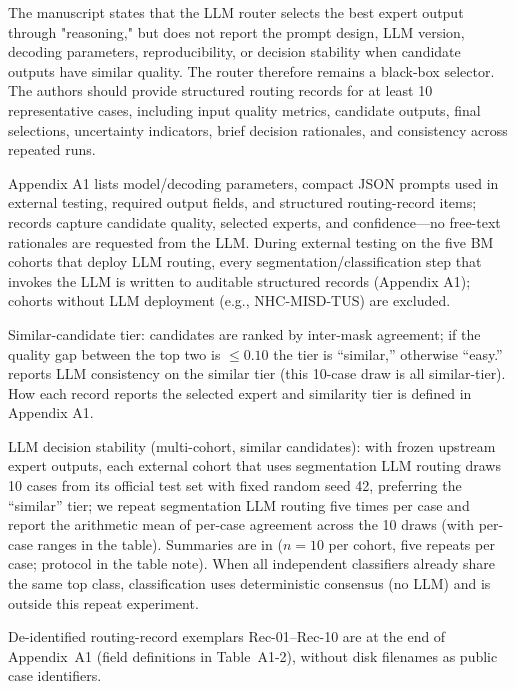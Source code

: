 \begin{reviewercomment}
The manuscript states that the LLM router selects the best expert output through "reasoning," but does not report the prompt design, LLM version, decoding parameters, reproducibility, or decision stability when candidate outputs have similar quality. The router therefore remains a black-box selector. The authors should provide structured routing records for at least 10 representative cases, including input quality metrics, candidate outputs, final selections, uncertainty indicators, brief decision rationales, and consistency across repeated runs.
\end{reviewercomment}
\begin{authorresponse}
Appendix A1 lists model/decoding parameters, compact JSON prompts used in external testing, required output fields, and structured routing-record items; records capture candidate quality, selected experts, and confidence---no free-text rationales are requested from the LLM. During external testing on the five BM cohorts that deploy LLM routing, every segmentation/classification step that invokes the LLM is written to auditable structured records (Appendix A1); cohorts without LLM deployment (e.g., NHC-MISD-TUS) are excluded.\par
Similar-candidate tier: candidates are ranked by inter-mask agreement; if the quality gap between the top two is $\leq 0.10$ the tier is ``similar,'' otherwise ``easy.''  reports LLM consistency on the similar tier (this 10-case draw is all similar-tier). How each record reports the selected expert and similarity tier is defined in Appendix A1.\par
LLM decision stability (multi-cohort, similar candidates): with frozen upstream expert outputs, each external cohort that uses segmentation LLM routing draws 10 cases from its official test set with fixed random seed 42, preferring the ``similar'' tier; we repeat segmentation LLM routing five times per case and report the arithmetic mean of per-case agreement across the 10 draws (with per-case ranges in the table). Summaries are in  ($n{=}10$ per cohort, five repeats per case; protocol in the table note). When all independent classifiers already share the same top class, classification uses deterministic consensus (no LLM) and is outside this repeat experiment.\par
De-identified routing-record exemplars Rec-01--Rec-10 are at the end of Appendix~A1 (field definitions in Table~A1-2), without disk filenames as public case identifiers.\par
\par
\end{authorresponse}

